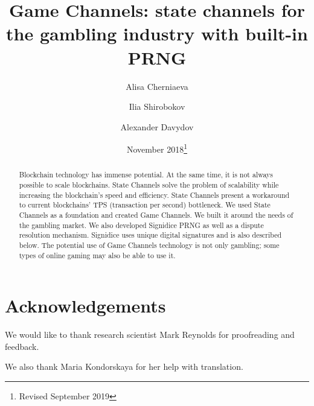 \documentclass[tikz, 12pt]{article}
\title {Game Channels: state channels for the gambling industry with built-in PRNG}
\author[1]{Alisa Cherniaeva}
\author[1]{Ilia Shirobokov}
\author[2]{Alexander Davydov}
\affil[1]{BlockProof Tech LLC\thanks{research@blockproof.tech}}
\affil[2]{DAO.Casino\thanks{research@dao.casino}}
\date {November 2018\footnote{Revised  September 2019}}
\theoremstyle{definition}
\theoremstyle{remark}
\begin{document}
\maketitle
	\begin{abstract}
Blockchain technology has immense potential. At the same time, it is not always possible to scale blockchains. State Channels solve the problem of scalability while increasing the blockchain's speed and efficiency. State Channels present a workaround to current blockchains' TPS (transaction per second) bottleneck. We used State Channels as a foundation and created Game Channels. We built it around the needs of the gambling market. We also developed Signidice PRNG as well as a dispute resolution mechanism. Signidice uses unique digital signatures and is also described below. The potential use of Game Channels technology is not only gambling; some types of online gaming may also be able to use it.

	\end{abstract}
\tableofcontents	
	
	
		

\section*{Acknowledgements}
We would like to thank research scientist Mark Reynolds for proofreading and feedback.

We also thank Maria Kondorskaya for her help with translation.  
\end{document}
